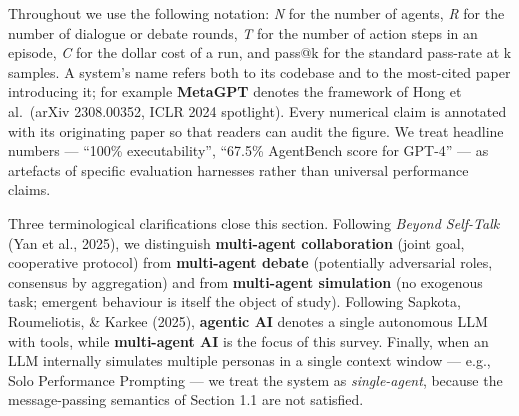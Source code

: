 Throughout we use the following notation: \emph{N} for the number of agents, \emph{R} for the number of dialogue or debate rounds, \emph{T} for the number of action steps in an episode, \emph{C} for the dollar cost of a run, and pass@k for the standard pass-rate at k samples. A system's name refers both to its codebase and to the most-cited paper introducing it; for example \textbf{MetaGPT} denotes the framework of Hong et al.~(arXiv 2308.00352, ICLR 2024 spotlight). Every numerical claim is annotated with its originating paper so that readers can audit the figure. We treat headline numbers --- ``100\% executability'', ``67.5\% AgentBench score for GPT-4'' --- as artefacts of specific evaluation harnesses rather than universal performance claims.

Three terminological clarifications close this section. Following \emph{Beyond Self-Talk} (Yan et al., 2025), we distinguish \textbf{multi-agent collaboration} (joint goal, cooperative protocol) from \textbf{multi-agent debate} (potentially adversarial roles, consensus by aggregation) and from \textbf{multi-agent simulation} (no exogenous task; emergent behaviour is itself the object of study). Following Sapkota, Roumeliotis, \& Karkee (2025), \textbf{agentic AI} denotes a single autonomous LLM with tools, while \textbf{multi-agent AI} is the focus of this survey. Finally, when an LLM internally simulates multiple personas in a single context window --- e.g., Solo Performance Prompting --- we treat the system as \emph{single-agent}, because the message-passing semantics of Section 1.1 are not satisfied.

